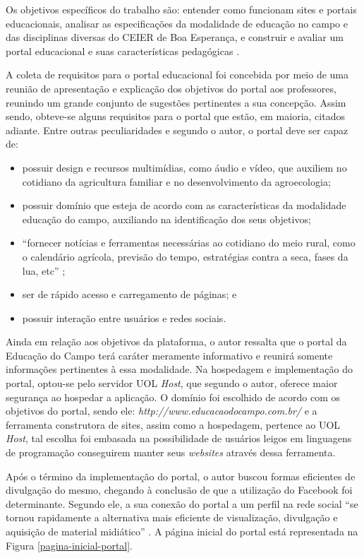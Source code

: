 Os objetivos específicos do trabalho são: entender como funcionam sites e portais educacionais, analisar as especificações da modalidade de educação no campo e das disciplinas diversas do CEIER de Boa Esperança, e construir e avaliar um portal educacional e suas características pedagógicas .

A coleta de requisitos para o portal educacional foi concebida por meio de uma reunião de apresentação e explicação dos objetivos do portal aos professores, reunindo um grande conjunto de sugestões pertinentes a sua concepção. Assim sendo, obteve-se alguns requisitos para o portal que estão, em maioria, citados adiante. Entre outras peculiaridades e segundo o autor, o portal deve ser capaz de:

\begin{itemize}
 \item possuir design e recursos multimídias, como áudio e vídeo, que auxiliem no cotidiano da agricultura familiar e no desenvolvimento da agroecologia;
 \item possuir domínio que esteja de acordo com as características da modalidade educação do campo, auxiliando na identificação dos seus objetivos;
 \item ``fornecer notícias e ferramentas necessárias ao cotidiano do meio rural, como o calendário agrícola, previsão do tempo, estratégias contra a seca, fases da lua, etc'' \cite{soares2017construccao};
 \item ser de rápido acesso e carregamento de páginas; e
 \item possuir interação entre usuários e redes sociais.
\end{itemize}

Ainda em relação aos objetivos da plataforma, o autor ressalta que o portal da Educação do Campo terá caráter meramente informativo e reunirá somente informações pertinentes à essa modalidade. Na hospedagem e implementação do portal, optou-se pelo servidor UOL \textit{Host}, que segundo o autor, oferece maior segurança ao hospedar a aplicação. O domínio foi escolhido de acordo com os objetivos do portal, sendo ele: \textit{http://www.educacaodocampo.com.br/} e a ferramenta construtora de sites, assim como a hospedagem, pertence ao UOL \textit{Host}, tal escolha foi embasada na possibilidade de usuários leigos em linguagens de programação conseguirem manter seus \textit{websites} através dessa ferramenta.

Após o término da implementação do portal, o autor buscou formas eficientes de divulgação do mesmo, chegando à conclusão de que a utilização do Facebook foi determinante. Segundo ele, a sua conexão do portal a um perfil na rede social ``se tornou rapidamente a alternativa mais eficiente de visualização, divulgação e aquisição de material midiático'' \cite{soares2017construccao}. A página inicial do portal está representada na Figura \ref{pagina-inicial-portal}.

